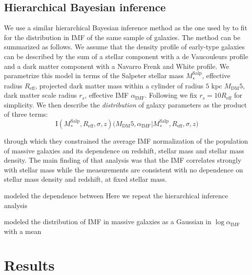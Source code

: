 \documentclass[usenatbib, letters]{mnras}
\def\mdm{M_{\mathrm{DM}}}
\def\reff{R_{\mathrm{eff}}}
\def\msalp{M_*^{\mathrm{Salp}}}
\def\aimf{\alpha_{\mathrm{IMF}}}
\begin{document}
\subsection{Hierarchical Bayesian inference}
We use a similar hierarchical Bayesian inference method as the one used by \citet{Son++15} to fit for the distribution in IMF of the same sample of galaxies. The method can be summarized as follows.
We assume that the density profile of early-type galaxies can be described by the sum of a stellar component with a de Vaucouleurs profile and a dark matter component with a Navarro Frenk and White \citep{NFW97} profile.
We parametrize this model in terms of the Salpeter stellar mass $\msalp$, effective radius $\reff$, projected dark matter mass within a cylinder of radius $5$ kpc $\mdm5$, dark matter scale radius $r_s$, effective IMF $\aimf$.
Following \citet{Son++15} we fix $r_s = 10\reff$ for simplicity.
We then describe the {\em distribution} of galaxy parameters as the product of three terms:
\begin{equation}
\mathrm{I}(\msalp, \reff, \sigma, z)\mathrm(\mdm5, \aimf | \msalp, \reff, \sigma, z)
\end{equation}




through which they constrained the average IMF normalization of the population of massive galaxies and its dependence on redshift, stellar mass and stellar mass density.
The main finding of that analysis was that the IMF correlates strongly with stellar mass while the measurements are consistent with no dependence on stellar mass density and redshift, at fixed stellar mass.

\citet{Son++15} modeled the dependence between
Here we repeat the hierarchical inference analysis 

modeled the distribution of IMF in massive galaxies as a Gaussian in $\log{\aimf}$ with a mean 


\section{Results}\label{sect:results}
\end{document}
